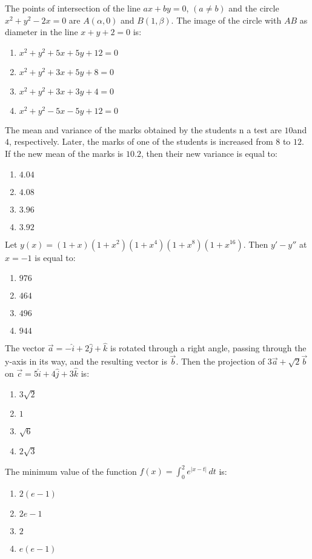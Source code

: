 \item The points of intersection of the line $ax + by = 0$, $(a \neq b)$ and the circle $x^2 + y^2 - 2x = 0$ are $A(\alpha, 0)$ and $B(1, \beta)$. The image of the circle with $AB$ as diameter in the line $x + y + 2 = 0$ is:
    \begin{enumerate}
        \item $x^2 + y^2 + 5x + 5y + 12 = 0$
        \item $x^2 + y^2 + 3x + 5y + 8 = 0$
        \item $x^2 + y^2 + 3x + 3y + 4 = 0$
        \item $x^2 + y^2 - 5x - 5y + 12 = 0$
    \end{enumerate}

 \item The mean and variance of the marks obtained by the students n a test are $10$and $4$, respectively. Later, the marks of one of the students is increased from $8$ to $12$. If the new mean of the marks is $10.2$, then their new variance is equal to:
    \begin{enumerate}
        \item $4.04$
        \item $4.08$
        \item $3.96$
        \item $3.92$
    \end{enumerate}

\item Let $y(x) = (1+x)(1+x^2)(1+x^4)(1+x^8)(1+x^{16})$. 
Then $y' - y''$ at $x = -1$ is equal to:

\begin{enumerate}
    \item $976$
    \item $464$
    \item $496$
    \item $944$
\end{enumerate}
\item The vector $\vec{a} = -\hat{i} + 2\hat{j} + \hat{k}$ is rotated through a right angle, passing through the y-axis in its way, and the resulting vector is $\vec{b}$. Then the projection of $3\vec{a} + \sqrt{2}\vec{b}$ on $\vec{c} = 5\hat{i} + 4\hat{j} + 3\hat{k}$ is:
\begin{enumerate}
    \item $3\sqrt{2}$
    \item $1$
    \item $\sqrt{6}$
    \item $2\sqrt{3}$
\end{enumerate}
\item The minimum value of the function 
$f(x) = \int_0^2 e^{|x-t|} \, dt$
is:
\begin{enumerate}
    \item $2(e - 1)$
    \item $2e - 1$
    \item $2$
    \item $e(e - 1)$
\end{enumerate}

